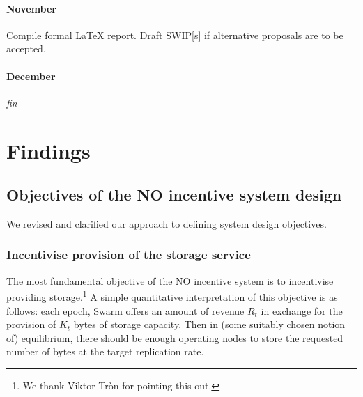 \paragraph{November} Compile formal LaTeX report. Draft SWIP[s] if alternative proposals are to be accepted.

\paragraph{December} \emph{fin}




\newpage
\section*{Findings}

\begin{comment}
\subsection*{Summary}

\begin{itemize}
  \item 
  \item We studied risk of drawdowns and ruin for NOs of different sizes and its dependence on the reward lottery structure.
  \item We couched the pre-2.2 stake system and SWIPs 19 and 20 in a language of equity and options which aids intuition.
  The objective of this activity was to formulate a generalised model that incorporates current proposals and is flexible enough to provide a common language for the evaluation of future proposals.
  This framework is not yet complete.
\end{itemize}
\end{comment}

\subsection*{Objectives of the NO incentive system design}

We revised and clarified our approach to defining system design objectives.

\subsubsection*{Incentivise provision of the storage service}

The most fundamental objective of the NO incentive system is to incentivise providing storage.\footnote{We thank Viktor Tr\`on for pointing this out.}
%
A simple quantitative interpretation of this objective is as follows: each epoch, Swarm offers an amount of revenue $R_t$ in exchange for the provision of $K_t$ bytes of storage capacity.
%
Then in (some suitably chosen notion of) equilibrium, there should be enough operating nodes to store the requested number of bytes at the target replication rate.

